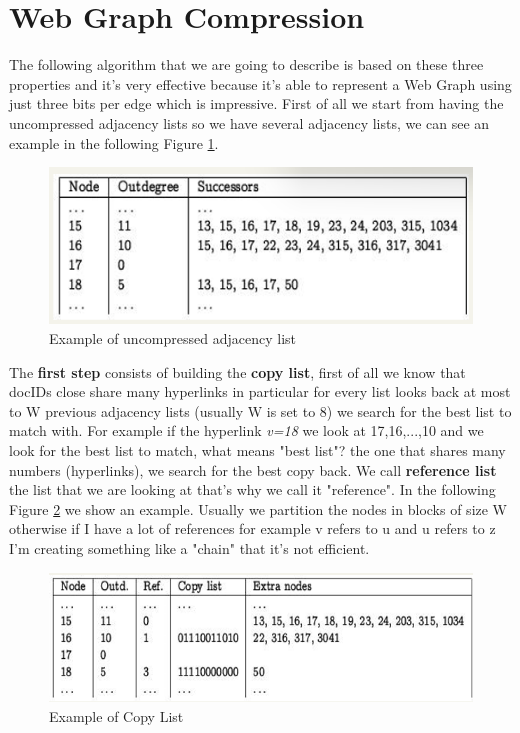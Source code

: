\section{Web Graph Compression}
The following algorithm that we are going to describe is based on these three properties and it's very effective because it's able to represent a Web Graph using just three bits per edge which is impressive.\newline
First of all we start from having the uncompressed adjacency lists so we have several adjacency lists, we can see an example in the following Figure \ref{fig:uncompressedad}.
\begin{figure}
    \centering
    \includegraphics[width=0.75\linewidth]{images/uncompressed.png}
    \caption{Example of uncompressed adjacency list}
    \label{fig:uncompressedad}
\end{figure}
The \textbf{first step} consists of building the \textbf{copy list}, first of all we know that docIDs close share many hyperlinks in particular for every list looks back at most to W previous adjacency lists (usually W is set to 8) we search for the best list to match with. For example if the hyperlink \textit{v=18} we look at 17,16,...,10 and we look for the best list to match, what means "best list"? the one that shares many numbers (hyperlinks), we search for the best copy back.\newline
We call \textbf{reference list} the list that we are looking at that's why we call it "reference". In the following Figure \ref{fig:copylist} we show an example. Usually we partition the nodes in blocks of size W otherwise if I have a lot of references for example v refers to u and u refers to z I'm creating something like a "chain" that it's not efficient.
\begin{figure}
    \centering
    \includegraphics[width=0.75\linewidth]{images/copylist.png}
    \caption{Example of Copy List}
    \label{fig:copylist}
\end{figure}
